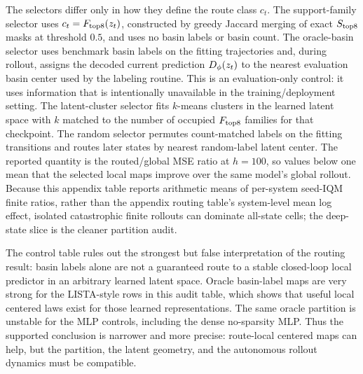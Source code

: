The selectors differ only in how they define the route class \(c_t\). The support-family selector uses \(c_t=F_{\rm top8}(z_t)\), constructed by greedy Jaccard merging of exact \(S_{\rm top8}\) masks at threshold \(0.5\), and uses no basin labels or basin count. The oracle-basin selector uses benchmark basin labels on the fitting trajectories and, during rollout, assigns the decoded current prediction \(D_\phi(z_t)\) to the nearest evaluation basin center used by the labeling routine. This is an evaluation-only control: it uses information that is intentionally unavailable in the training/deployment setting. The latent-cluster selector fits \(k\)-means clusters in the learned latent space with \(k\) matched to the number of occupied \(F_{\rm top8}\) families for that checkpoint. The random selector permutes count-matched labels on the fitting transitions and routes later states by nearest random-label latent center. The reported quantity is the routed/global MSE ratio at \(h=100\), so values below one mean that the selected local maps improve over the same model's global rollout. Because this appendix table reports arithmetic means of per-system seed-IQM finite ratios, rather than the appendix routing table's system-level mean log effect, isolated catastrophic finite rollouts can dominate all-state cells; the deep-state slice is the cleaner partition audit.



The control table rules out the strongest but false interpretation of the routing result: basin labels alone are not a guaranteed route to a stable closed-loop local predictor in an arbitrary learned latent space. Oracle basin-label maps are very strong for the LISTA-style rows in this audit table, which shows that useful local centered laws exist for those learned representations. The same oracle partition is unstable for the MLP controls, including the dense no-sparsity MLP. Thus the supported conclusion is narrower and more precise: route-local centered maps can help, but the partition, the latent geometry, and the autonomous rollout dynamics must be compatible.

